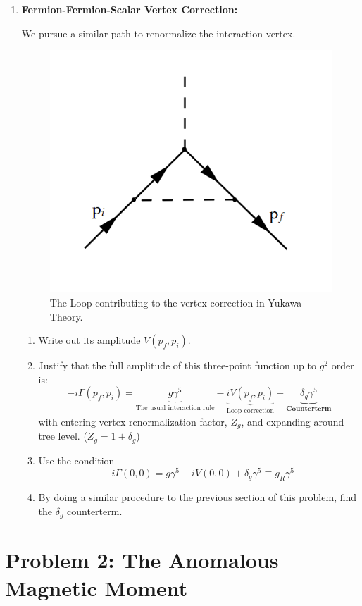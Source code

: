 \documentclass[11pt]{article}
\begin{document}
\begin{enumerate}
\begin{problem}{\points{-}}
	
	
	
	
	
			
		
		
		\end{problem}
	
		\item
		\begin{problem}{\points{-}}
		\textbf{Fermion-Fermion-Scalar Vertex Correction:}
		
		We pursue a similar path to renormalize the interaction vertex.
		 
		\begin{figure}[H]
			\centering
			\includegraphics[width=0.3\linewidth]{img/2.png}
			\caption{The Loop contributing to the vertex correction in Yukawa Theory.}
			\label{yuk2}
		\end{figure}
\begin{enumerate}
	\item Write out its amplitude $V(p_f,p_i)$.
	\item Justify that the full amplitude of this three-point function up to $g^2$ order is:
	\[
	-i\Gamma (p_f,p_i) = \underbrace{g\gamma^5}_{\text{The usual interaction rule}} - \underbrace{iV(p_f,p_i)}_{\text{Loop correction}} +\underbrace{\delta_g \gamma^5}_{\textbf{Counterterm}}
	\]
	with entering vertex renormalization factor, $Z_g$, and expanding around tree level. ($Z_g = 1 + \delta_g$)
	\item Use the condition
	\[
	-i\Gamma(0,0) = g\gamma^5 -iV(0,0) + \delta_g \gamma^5 \equiv g_R \gamma^5
	\]
	\item By doing a similar procedure to the previous section of this problem, find the $\delta_g$ counterterm.

\end{enumerate}
	
		\end{problem}

\end{enumerate}

\newpage
	\section*{Problem 2: The Anomalous Magnetic Moment }
 
\end{document}
